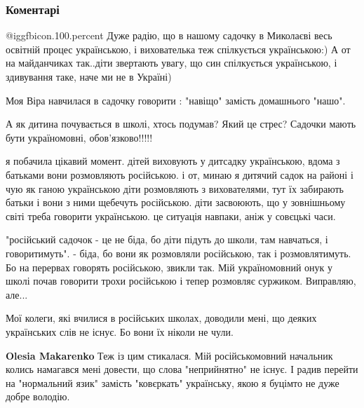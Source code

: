 
 
 
 
 
\subsubsection{Коментарі}
\label{sec:18_09_2021.fb.bryhar_sergej.1.deti_sadik_mova.cmt}

\begin{itemize} %
 @igg{fbicon.100.percent} 
Дуже радію, що в нашому садочку в Миколаєві весь освітній процес українською, і вихователька теж спілкується українською:)
А от на майданчиках так..діти звертають увагу, що син спілкується українською, і здивування таке, наче ми не в Україні)

Моя Віра навчилася в садочку говорити : "навіщо" замість домашнього "нашо".

А як дитина почувається в школі, хтось подумав? Який це стрес? Садочки мають
бути україномовні, обов'язково!!!!!

я побачила цікавий момент. дітей виховують у дитсадку українською, вдома з
батьками вони розмовляють російською. і от, минаю я дитячий садок на районі і
чую як ганою українською діти розмовляють з вихователями, тут їх забирають
батьки і вони з ними щебечуть російською. діти засвоюють, що у зовнішньому
світі треба говорити українською. це ситуація навпаки, аніж у совєцькі часи.



"російський садочок - це не біда, бо діти підуть до школи, там навчаться, і
говоритимуть". - біда, бо вони як розмовляли російською, так і розмовлятимуть.
Бо на перервах говорять російською, звикли так. Мій україномовний онук у школі
почав говорити трохи російською і тепер розмовляє суржиком. Виправляю, але...



Мої колеги, які вчилися в російських школах, доводили мені, що деяких
українських слів не існує. Бо вони їх ніколи не чули.

\begin{itemize} %
\textbf{Olesia Makarenko} Теж із цим стикалася. Мій російськомовний начальник колись намагався мені довести, що слова "неприйнятно" не існує. І радив перейти на "нормальний язик" замість "ковєркать" українську, якою я буцімто не дуже добре володію.


\end{itemize}
\end{itemize}
